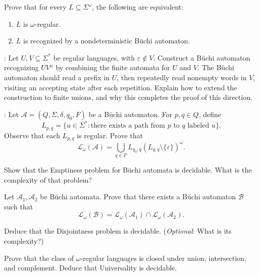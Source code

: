 \documentclass[11pt,a4paper]{tutorial}
\newcommand{\Lang}{\mathcal{L}}
\let\L=\Lang
\begin{document}
\begin{exercise}
Prove that for every $L\subseteq\Sigma^\omega$, 
the following are equivalent:
\begin{enumerate}
\item $L$ is $\omega$-regular.
\item $L$ is recognized by a nondeterministic Büchi automaton.
\end{enumerate}
\medskip
{}:
Let $U,V\subseteq\Sigma^*$ be regular languages, with
$\varepsilon\notin V$. Construct a Büchi automaton recognizing
\(UV^\omega\)
by combining the finite automata for $U$ and $V$. The Büchi automaton
should read a prefix in $U$, then repeatedly read nonempty
words in $V$, visiting an accepting state after each repetition.
Explain how to extend the construction to finite unions,
and why this completes the proof of this direction.
\bigskip

:
Let \(\mathcal A=(Q,\Sigma,\delta,q_0,F)\)
be a Büchi automaton. For $p,q\in Q$, define
\[
L_{p,q}
=
\{u\in\Sigma^*:
\text{there exists a path from $p$ to $q$ labeled $u$}\}.
\]
Observe that each $L_{p,q}$ is regular.
Prove that
\[
\L_\omega(\mathcal A)=
\bigcup_{q\in F}L_{q_0,q}\left(L_{q,q}\setminus\{\varepsilon\}\right)^\omega.
\]

\end{exercise}


\begin{exercise}[Emptiness]
Show that the Emptiness problem for Büchi automata is decidable.
What is the complexity of that problem?
\end{exercise}

\begin{exercise}[Intersection]
Let $\mathcal A_1,\mathcal A_2$ be Büchi automata.
Prove that there exists a Büchi automaton $\mathcal B$ such that
\[
\L_\omega(\mathcal B)=\L_\omega(\mathcal A_1)\cap\L_\omega(\mathcal A_2).
\]


Deduce that the Disjointness problem is decidable.
(\textit{Optional}: What is its complexity?)
\end{exercise}


\begin{exercise}
Prove that the class of $\omega$-regular languages is closed under
union, intersection, and complement.
Deduce that Universality is decidable.
\end{exercise}
\end{document}
